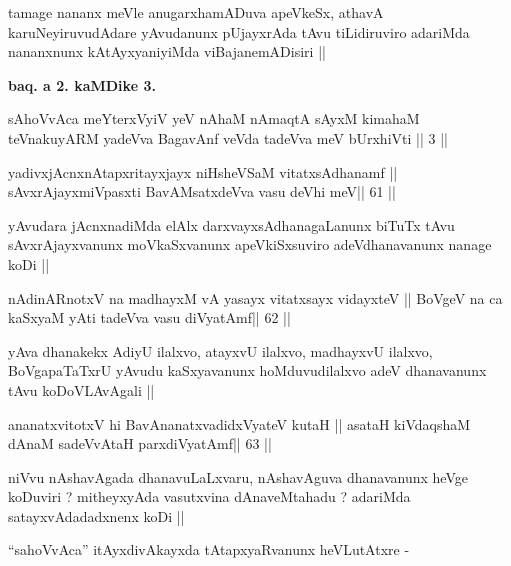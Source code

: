 \begin{artha}
tamage nananx meVle anugarxhamADuva apeVkeSx, athavA
karuNeyiruvudAdare yAvudanunx pUjayxrAda tAvu tiLidiruviro adariMda
nananxnunx kAtAyxyaniyiMda viBajanemADisiri ||
\end{artha}

\begin{center}
\textbf{baq. a 2. kaMDike 3.}
\end{center}

\begin{artha}
sAhoVvAca meYterxVyiV yeV nAhaM nAmaqtA sAyxM kimahaM teVnakuyARM
yadeVva BagavAnf veVda tadeVva meV bUrxhiVti || 3 ||
\end{artha}

\begin{shl}
yadivxjAcnxnAtapxritayxjayx niHsheVSaM vitatxsAdhanamf ||
sAvxrAjayxmiVpasxti BavAMsatxdeVva vasu deVhi meV\hfill || 61 ||
\end{shl}

\begin{artha}
yAvudara jAcnxnadiMda elAlx darxvayxsAdhanagaLanunx biTuTx tAvu
sAvxrAjayxvanunx moVkaSxvanunx apeVkiSxsuviro adeVdhanavanunx nanage
koDi ||
\end{artha}

\begin{shl}
nA\s\s dinARnotxV na madhayxM vA yasayx vitatxsayx vidayxteV ||
BoVgeV na ca kaSxyaM yAti tadeVva vasu diVyatAmf\hfill || 62 ||
\end{shl}

\begin{artha}
yAva dhanakekx AdiyU ilalxvo, atayxvU ilalxvo, madhayxvU ilalxvo,
BoVgapaTaTxrU yAvudu kaSxyavanunx hoMduvudilalxvo adeV dhanavanunx
tAvu koDoVLAvAgali ||
\end{artha}

\begin{shl}
ananatxvitotxV hi BavAnanatxvadidxVyateV kutaH ||
asataH kiVdaqshaM dAnaM sadeVvAtaH parxdiVyatAmf\hfill || 63 ||
\end{shl}

\begin{artha}
niVvu nAshavAgada dhanavuLaLxvaru, nAshavAguva dhanavanunx heVge
koDuviri ? mitheyxyAda vasutxvina dAnaveMtahadu ? adariMda
satayxvAdadadxnenx koDi ||
\end{artha}

\begin{artha}
``sahoVvAca'' itAyxdivAkayxda tAtapxyaRvanunx heVLutAtxre -
\end{artha}

